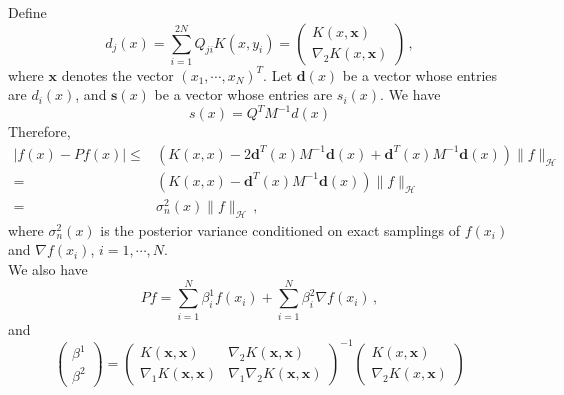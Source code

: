 \documentclass[a4paper,onecolumn]{article}
\begin{document}
Define
$$
    d_j(x) = \sum_{i=1}^{2N} Q_{ji} K(x, y_i) = \begin{pmatrix}
        K(x,\mathbf{x}) \\ \nabla_2 K(x, \mathbf{x})
    \end{pmatrix}\,,
$$
where $\mathbf{x}$ denotes the vector $(x_1, \cdots, x_N)^T$. Let $\mathbf{d}(x)$ be a vector whose entries are $d_i(x)$, and
$\mathbf{s}(x)$ be a vector whose entries are $s_i(x)$.
We have
$$
    s(x) = Q^TM^{-1} d(x)
$$
Therefore,
\begin{equation*}\begin{split}
    \left|f(x) - Pf(x)\right| \le & \left(K(x,x) -2\mathbf{d}^T(x) M^{-1} \mathbf{d}(x) + \mathbf{d}^T(x) M^{-1} \mathbf{d}(x) \right) \|f\|_\mathcal{H} \\
    = & \left(K(x,x) - \mathbf{d}^T(x) M^{-1} \mathbf{d}(x)\right) \|f\|_\mathcal{H}\\
    =& \sigma^2_n(x) \|f\|_\mathcal{H}\,,
\end{split}\end{equation*}
where $\sigma^2_n(x)$ is the posterior variance conditioned on exact samplings of $f(x_i)$ and $\nabla f(x_i)$, $i=1,\cdots,N$.\\
We also have
$$
    Pf = \sum_{i=1}^N {\beta}_i^1 f(x_i) + \sum_{i=1}^N {\beta}_i^2 {\nabla f(x_i)}\,,
$$
and
\begin{equation*}
    \begin{pmatrix}
        {\beta}^1\\
        {\beta}^2
    \end{pmatrix}
    = 
    \begin{pmatrix}
        K(\mathbf{x}, \mathbf{x}) & \nabla_2 K(\mathbf{x}, \mathbf{x})\\
        \nabla_1 K(\mathbf{x}, \mathbf{x}) & \nabla_1 \nabla_2 K(\mathbf{x},\mathbf{x})
    \end{pmatrix}^{-1}
    \begin{pmatrix}
        K(x,\mathbf{x})\\
        \nabla_2 K(x, \mathbf{x})
    \end{pmatrix}
\end{equation*}
\end{document}
